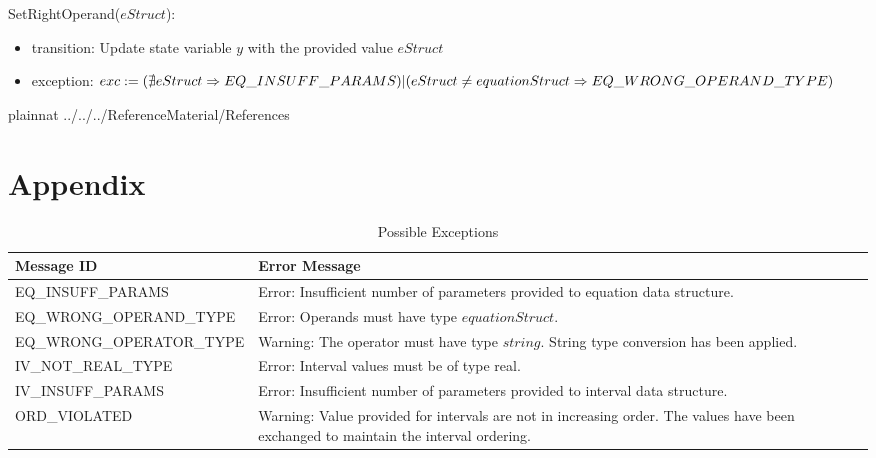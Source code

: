 \documentclass[12pt, titlepage]{article}
\begin{document}
\noindent SetRightOperand($eStruct$):
\begin{itemize}
	\item transition: Update state variable $y$ with the provided value 
	$eStruct$
	\item exception: $exc := \\
	(\nexists eStruct \Rightarrow EQ\_INSUFF\_PARAMS)\\
	|\\
	(eStruct \neq equationStruct \Rightarrow EQ\_WRONG\_OPERAND\_TYPE)$	
\end{itemize}

\newpage

 {plainnat}
 {../../../ReferenceMaterial/References}

\newpage

\section{Appendix} \label{Appendix}

\renewcommand{\arraystretch}{1.2}

\begin{longtable}{l p{9.5cm}}
	\caption{Possible Exceptions} \\
	\toprule
	\textbf{Message ID} & \textbf{Error Message} \\
	\midrule
	EQ\_INSUFF\_PARAMS & Error: Insufficient number of parameters provided to 
	equation data structure.\\
	EQ\_WRONG\_OPERAND\_TYPE & Error: Operands must have type 
	$equationStruct$.\\
	EQ\_WRONG\_OPERATOR\_TYPE & Warning: The operator must have type $string$. 
	String type conversion has been applied.\\
	IV\_NOT\_REAL\_TYPE & Error: Interval values must be of type real. \\
	IV\_INSUFF\_PARAMS & Error: Insufficient number of parameters provided to 
	interval data structure. \\
	ORD\_VIOLATED & Warning: Value provided for intervals are not in increasing 
	order. The values have been exchanged to maintain the interval ordering. \\
	\bottomrule
\end{longtable}
\end{document}
